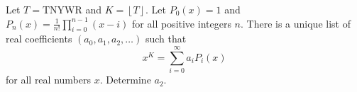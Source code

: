 Let $T=\text{TNYWR}$ and $K=\left\lfloor T\right\rfloor$. Let $P_0\left(x\right)=1$ and $P_n\left(x\right)=\frac{1}{n!}\displaystyle\prod_{i=0}^{n-1}\left(x-i\right)$ for all positive integers $n$. There is a unique list of real coefficients $\left(a_0,a_1,a_2,\ldots\right)$ such that \[x^K=\displaystyle\sum_{i=0}^{\infty}a_iP_i\left(x\right)\] for all real numbers $x$. Determine $a_2$.